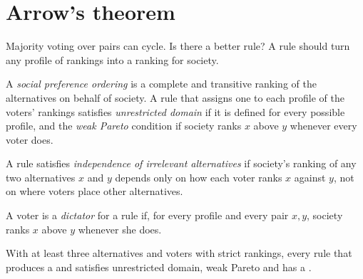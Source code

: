 \section{Arrow's theorem}\label{sec:b2:social-choice:arrow}

Majority voting over pairs can cycle. Is there a better rule? A rule should turn any profile of rankings
into a ranking for society.

\begin{definition}\label{def:b2:social-choice:social-ordering}
A \emph{social preference ordering} is a complete and transitive
ranking of the alternatives on behalf of society. A rule that assigns one to each profile of the voters'
rankings satisfies \emph{unrestricted domain} if it is defined for every possible profile, and the
\emph{weak Pareto} condition if society ranks $x$ above $y$ whenever every voter does.
\end{definition}

\begin{definition}\label{def:b2:social-choice:iia}
A rule satisfies \emph{independence of irrelevant alternatives} if society's ranking of any two alternatives $x$ and $y$ depends only on how each voter ranks
$x$ against $y$, not on where voters place other alternatives.
\end{definition}

\begin{definition}[Dictator]\label{def:b2:social-choice:dictator}
A voter is a \emph{dictator} for a rule if, for every profile and every pair
$x, y$, society ranks $x$ above $y$ whenever she does.
\end{definition}

\begin{theorem}\label{thm:b2:social-choice:arrow}
With at least three alternatives and voters with strict rankings, every rule that produces a  and satisfies unrestricted domain, weak Pareto and  has a .
\end{theorem}

